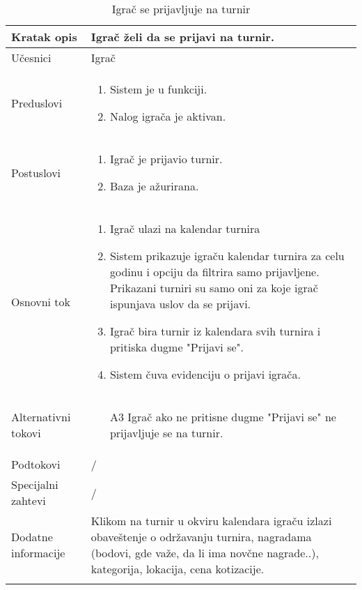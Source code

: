 \documentclass{article}
\begin{document}
        \begin{longtable}{| p{} | p{} |} 
            \hline
                Kratak opis & Igrač želi da se prijavi na turnir.\\ 
            \hline    
                Učesnici & Igrač \\
            \hline
               Preduslovi & \begin{enumerate}
                   \item Sistem je u funkciji.
                   \item Nalog igrača je aktivan.
               \end{enumerate}\\
            \hline  
                Postuslovi & \begin{enumerate}
                    \item Igrač je prijavio turnir.
                    \item Baza je ažurirana.
                \end{enumerate}\\
            \hline
                Osnovni tok & \begin{enumerate}
                    \item Igrač ulazi na kalendar turnira
                    \item Sistem prikazuje igraču kalendar turnira za celu godinu i opciju da filtrira samo prijavljene. Prikazani turniri su samo oni za koje igrač ispunjava uslov da se prijavi. 
                    \item Igrač bira turnir iz kalendara svih turnira i pritiska dugme "Prijavi se".        
                    \item Sistem čuva evidenciju o prijavi igrača.
                \end{enumerate}\\
            \hline
                Alternativni tokovi & 
                \begin{itemize}
                    \item[A3] Igrač ako ne pritisne dugme "Prijavi se" ne prijavljuje se na turnir.
                \end{itemize}\\
            \hline
                Podtokovi & /\\
            \hline
                Specijalni zahtevi & /\\
            \hline
                Dodatne informacije & Klikom na turnir u okviru kalendara igraču izlazi obaveštenje o održavanju turnira, nagradama (bodovi, gde važe, da li ima novčne nagrade..), kategorija, lokacija, cena kotizacije. \\
            \hline
            \caption{Igrač se prijavljuje na turnir} 
        \end{longtable}
        
\end{document}
